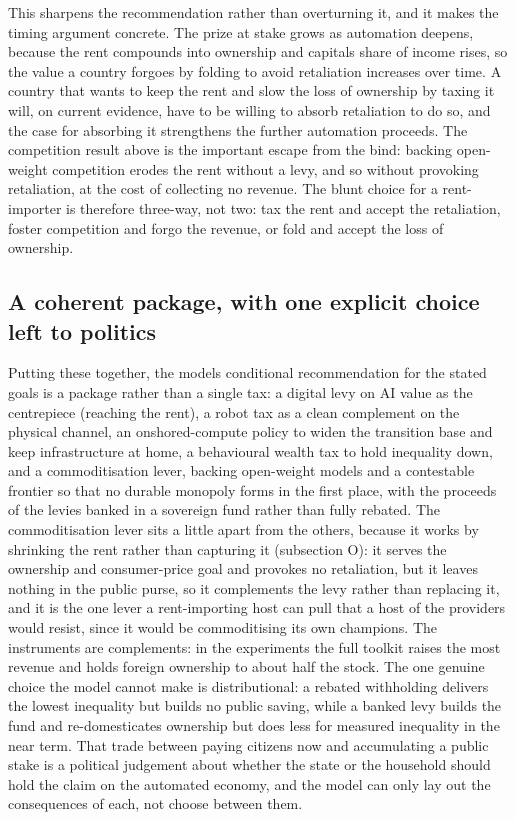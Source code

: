 \documentclass[11pt]{article}
\begin{document}
This sharpens the recommendation rather than overturning it, and it
makes the timing argument concrete. The prize at stake grows as
automation deepens, because the rent compounds into ownership and
capital\textquotesingle s share of income rises, so the value a country
forgoes by folding to avoid retaliation increases over time. A country
that wants to keep the rent and slow the loss of ownership by taxing it
will, on current evidence, have to be willing to absorb retaliation to
do so, and the case for absorbing it strengthens the further automation
proceeds. The competition result above is the important escape from the
bind: backing open-weight competition erodes the rent without a levy,
and so without provoking retaliation, at the cost of collecting no
revenue. The blunt choice for a rent-importer is therefore three-way,
not two: tax the rent and accept the retaliation, foster competition and
forgo the revenue, or fold and accept the loss of ownership.

\hypertarget{a-coherent-package-with-one-explicit-choice-left-to-politics}{%
\subsection{A coherent package, with one explicit choice left to
politics}\label{a-coherent-package-with-one-explicit-choice-left-to-politics}}

Putting these together, the model\textquotesingle s conditional
recommendation for the stated goals is a package rather than a single
tax: a digital levy on AI value as the centrepiece (reaching the rent),
a robot tax as a clean complement on the physical channel, an
onshored-compute policy to widen the transition base and keep
infrastructure at home, a behavioural wealth tax to hold inequality
down, and a commoditisation lever, backing open-weight models and a
contestable frontier so that no durable monopoly forms in the first
place, with the proceeds of the levies banked in a sovereign fund rather
than fully rebated. The commoditisation lever sits a little apart from
the others, because it works by shrinking the rent rather than capturing
it (subsection O): it serves the ownership and consumer-price goal and
provokes no retaliation, but it leaves nothing in the public purse, so
it complements the levy rather than replacing it, and it is the one lever
a rent-importing host can pull that a host of the providers would resist,
since it would be commoditising its own champions. The instruments are complements: in the experiments the full
toolkit raises the most revenue and holds foreign ownership to about
half the stock. The one genuine choice the model cannot make is
distributional: a rebated withholding delivers the lowest inequality but
builds no public saving, while a banked levy builds the fund and
re-domesticates ownership but does less for measured inequality in the
near term. That trade between paying citizens now and accumulating a
public stake is a political judgement about whether the state or the
household should hold the claim on the automated economy, and the model
can only lay out the consequences of each, not choose between them.
\end{document}
